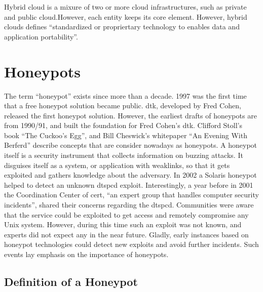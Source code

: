 Hybrid cloud is a mixure of two or more cloud infrastructures, such as private and public cloud.However, each entity keeps its core element. However, hybrid clouds defines \enquote{standardized or propriertary technology to enables data and application portability}\cite{Mell2011}.\\

\section{Honeypots}

The term \enquote{honeypot} exists since more than a decade. 1997 was the first time that a free honeypot solution became public. \ac{dtk}, developed by Fred Cohen, released the first honeypot solution. However, the earliest drafts of honeypots are from 1990/91, and built the foundation for Fred Cohen's \ac*{dtk}. Clifford Stoll's book \enquote{The Cuckoo's Egg}\cite{stroll2000}, and Bill Cheswick's whitepaper \enquote{An Evening With Berferd}\cite{Cheswick92} describe concepts that are consider nowadays as honeypots.\cite{Spitzner2003} A honeypot itself is a security instrument that collects information on buzzing attacks. It disguises itself as a system, or application with weaklinks, so that it gets exploited and gathers knowledge about the adversary. In 2002 a Solaris honeypot helped to detect an unknown dtspcd exploit. Interestingly, a year before in 2001 the Coordination Center of \ac{cert}, \enquote{an expert group that handles computer security incidents}, shared their concerns regarding the dtspcd. Communities were aware that the service could be exploited to get access and remotely compromise any Unix system. However, during this time such an exploit was not known, and experts did not expect any in the near future. Gladly, early instances based on honeypot technologies could detect new exploits and avoid further incidents. Such events lay emphasis on the importance of honeypots.

\subsection{Definition of a Honeypot}

